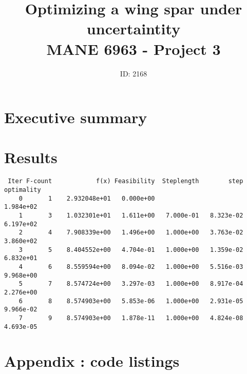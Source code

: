 \documentclass[10pt]{article}
\title{Optimizing a wing spar under uncertaintity \\MANE 6963 - Project 3}
\author{ID: 2168}
\date{}
\begin{document}
\maketitle

\section{Executive summary}

\section{Results}

\begin{verbatim}
 Iter F-count            f(x) Feasibility  Steplength        step  optimality
    0       1    2.932048e+01   0.000e+00                           1.984e+02
    1       3    1.032301e+01   1.611e+00   7.000e-01   8.323e-02   6.197e+02
    2       4    7.908339e+00   1.496e+00   1.000e+00   3.763e-02   3.860e+02
    3       5    8.404552e+00   4.704e-01   1.000e+00   1.359e-02   6.832e+01
    4       6    8.559594e+00   8.094e-02   1.000e+00   5.516e-03   9.968e+00
    5       7    8.574724e+00   3.297e-03   1.000e+00   8.917e-04   2.276e+00
    6       8    8.574903e+00   5.853e-06   1.000e+00   2.931e-05   9.966e-02
    7       9    8.574903e+00   1.878e-11   1.000e+00   4.824e-08   4.693e-05
\end{verbatim}

\newpage

\section{Appendix : code listings}



\newpage

\newpage

\newpage

\end{document}
